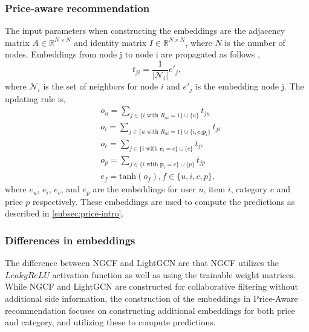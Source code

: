 \subsubsection{Price-aware recommendation}\label{subsubsec:price}
The input parameters when constructing the embeddings are the adjacency matrix $A \in \mathbb{R}^{N \times N}$ and identity matrix $I \in \mathbb{R}^{N \times N}$, where $N$ is the number of nodes.
Embeddings from node j to node i are propagated as follows \cite{Priceaware},
\begin{equation}
    t_{ji} = \frac{1}{|\mathcal{N}_i|}e'_j,
\end{equation}
where $\mathcal{N}_i$ is the set of neighbors for node $i$ and $e'_j$ is the embedding node j.
The updating rule is,
\begin{equation}
    \begin{split}
        & o_u = \sum_{j \in \{i \textrm{ with } R_{ui}=1 \} \cup \{ u\}}^{} t_{ju}                            \\
        & o_i = \sum_{j \in \{u \textrm{ with } R_{ui}=1 \} \cup \{ i, \textbf{c}_i \textbf{p}_i\}}^{} t_{ji} \\
        & o_c = \sum_{j \in \{i \textrm{ with } \textbf{c}_i=c \} \cup \{ c\}}^{} t_{jc}                      \\
        & o_p = \sum_{j \in \{i \textrm{ with } \textbf{p}_i=c \} \cup \{ p\}}^{} t_{jp}                      \\
        & e_f = \textrm{tanh}(o_f), f \in \{u, i, c, p\},
    \end{split}
\end{equation}
where $e_u$, $e_i$, $e_c$, and $e_p$ are the embeddings for user $u$, item $i$, category $c$ and price $p$ respectively.
These embeddings are used to compute the predictions as described in \autoref{subsec:price-intro}.

\subsubsection{Differences in embeddings}
The difference between NGCF and LightGCN are that NGCF utilizes the $LeakyReLU$ activation function as well as using the trainable weight matrices.
While NGCF and LightGCN are constructed for collaborative filtering without additional side information, the construction of the embeddings in Price-Aware recommendation focuses on constructing additional embeddings for both price and category, and utilizing these to compute predictions.

